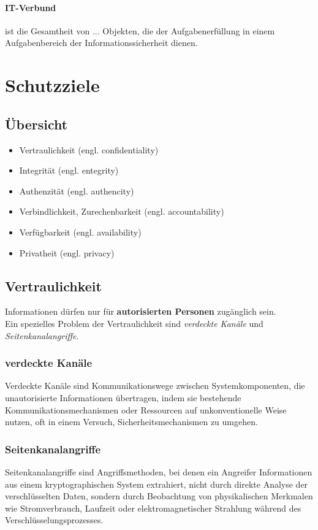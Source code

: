 \documentclass{report}
\begin{document}
\paragraph{IT-Verbund} ist die Gesamtheit von ... Objekten, die der Aufgabenerfüllung in einem Aufgabenbereich der Informationssicherheit dienen.

\section{Schutzziele}
\subsection{Übersicht}
\begin{itemize}
    \item Vertraulichkeit (engl. confidentiality)
    \item Integrität (engl. entegrity)
    \item Authenzität (engl. authencity)
    \item Verbindlichkeit, Zurechenbarkeit (engl. accountability)
    \item Verfügbarkeit (engl. availability)
    \item Privatheit (engl. privacy)
\end{itemize}
\subsection{Vertraulichkeit} 
Informationen dürfen nur für \textbf{autorisierten Personen} zugänglich sein. \\
Ein spezielles Problem der Vertraulichkeit sind \textit{verdeckte Kanäle} und \textit{Seitenkanalangriffe}.
\subsubsection{verdeckte Kanäle}
Verdeckte Kanäle sind Kommunikationswege zwischen Systemkomponenten, die unautorisierte Informationen übertragen,
indem sie bestehende Kommunikationsmechanismen oder Ressourcen auf unkonventionelle Weise nutzen, oft in einem Versuch, Sicherheitsmechanismen zu umgehen.
\subsubsection{Seitenkanalangriffe}
Seitenkanalangriffe sind Angriffsmethoden, bei denen ein Angreifer Informationen aus einem kryptographischen System extrahiert, nicht durch direkte Analyse der verschlüsselten Daten, sondern durch 
Beobachtung von physikalischen Merkmalen wie Stromverbrauch, Laufzeit oder elektromagnetischer Strahlung während des Verschlüsselungsprozesses.
\end{document}
